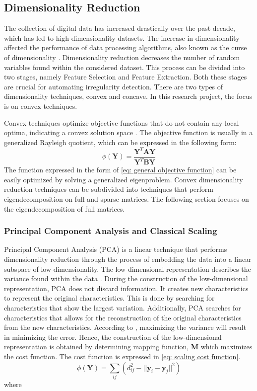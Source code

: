 \documentclass[11pt]{article}
\begin{document}
	\subsection{Dimensionality Reduction}
	The collection of digital data has increased drastically over the past decade, which has led to high dimensionality datasets. The increase in dimensionality affected the performance of data processing algorithms, also known as the curse of dimensionality \cite{Center2002}. Dimensionality reduction decreases the number of random variables found within the considered dataset. This process can be divided into two stages, namely Feature Selection and Feature Extraction. Both these stages are crucial for automating irregularity detection. There are two types of dimensionality techniques, convex and concave. In this research project, the focus is on convex techniques. 
	
	Convex techniques optimize objective functions that do not contain any local optima, indicating a convex solution space \cite{Boyd2010}. The objective function is usually in a generalized Rayleigh quotient, which can be expressed in the following form: 
	\begin{equation}
	\phi(\textbf{Y}) = \frac{\textbf{Y}^{T}\textbf{AY}}{\textbf{Y}^{T}\textbf{BY}}
	\label{eq: general objective function}
	\end{equation}
	The function expressed in the form of \eqref{eq: general objective function} can be easily optimized by solving a generalized eigenproblem. Convex dimensionality reduction techniques can be subdivided into techniques that perform eigendecomposition on full and sparse matrices. The following section focuses on the eigendecomposition of full matrices. 
	
	\subsubsection{Principal Component Analysis and Classical Scaling}
	Principal Component Analysis (PCA) is a linear technique that performs dimensionality reduction through the process of embedding the data into a linear subspace of low-dimensionality. The low-dimensional representation describes the variance found within the data \cite{Jolliffe2016}. During the construction of the low-dimensional representation, PCA does not discard information. It creates new characteristics to represent the original characteristics. This is done by searching for characteristics that show the largest variation. Additionally, PCA searches for characteristics that allows for the reconstruction of the original characteristics from the new characteristics. According to \cite{van2009dimensionality}, maximizing the variance will result in minimizing the error. Hence, the construction of the low-dimensional representation is obtained by determining mapping function,  \textbf{M} which maximizes the cost function. The cost function is expressed in \eqref{eq: scaling cost function}.
	\begin{equation}
	\phi(\textbf{Y}) = \sum_{ij}(d_{ij}^{2} - ||\textbf{y}_i - \textbf{y}_j||^2)
	\label{eq: scaling cost function}
	\end{equation}
	where 
	
\end{document}
